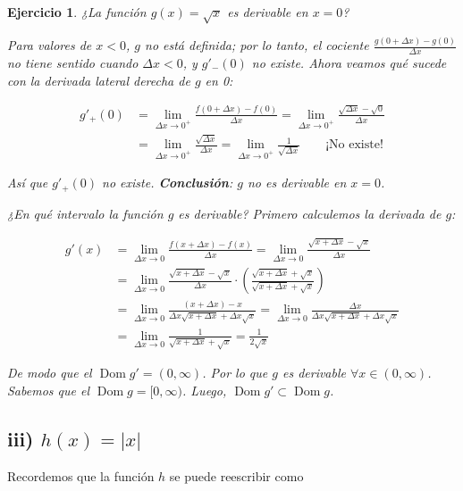 \documentclass[12pt,tikz,border=5pt]{article}
\newtheorem{ejercicio}{Ejercicio}[section]
\begin{document}
\begin{ejercicio}
¿La función $g(x) = \sqrt{x}$ es derivable en $x=0$?

Para valores de $x<0$, $g$ no está definida; por lo tanto, el cociente $\frac{g(0+\Delta x)-g(0)}{\Delta x}$ no tiene sentido cuando $\Delta x<0$, y $g'_-(0)$ no existe.
Ahora veamos qué sucede con la derivada lateral derecha de $g$ en 0:

\begin{align*}
g'_+(0) &= \lim_{\Delta x\to 0^+}\frac{f(0+\Delta x)-f(0)}{\Delta x} = \lim_{\Delta x\to 0^+}\frac{\sqrt{\Delta x}-\sqrt{0}}{\Delta x} \\[4pt]
&= \lim_{\Delta x\to 0^+}\frac{\sqrt{\Delta x}}{\Delta x} = \lim_{\Delta x\to 0^+}\frac{1}{\sqrt{\Delta x}} \qquad \text{¡No existe!}
\end{align*}

Así que $g'_{+}(0)$ no existe. \textbf{Conclusión}: $g$ no es derivable en $x=0$. \bigskip

¿En qué intervalo la función $g$ es derivable? Primero calculemos la derivada de $g$:

\begin{align*}
g'(x) &= \lim_{\Delta x\to 0}\frac{f(x+\Delta x)-f(x)}{\Delta x} = \lim_{\Delta x\to 0}\frac{\sqrt{x+\Delta x}-\sqrt{x}}{\Delta x} \\[4pt]
&= \lim_{\Delta x\to 0}\frac{\sqrt{x+\Delta x}-\sqrt{x}}{\Delta x}\cdot\left(\frac{\sqrt{x+\Delta x}+\sqrt{x}}{\sqrt{x+\Delta x}+\sqrt{x}}\right) \\[4pt]
&= \lim_{\Delta x\to 0}\frac{(x+\Delta x)-x}{\Delta x\sqrt{x+\Delta x}+\Delta x\sqrt{x}} = \lim_{\Delta x\to 0}\frac{\Delta x}{\Delta x\sqrt{x+\Delta x}+\Delta x\sqrt{x}} \\[4pt]
&= \lim_{\Delta x\to 0}\frac{1}{\sqrt{x+\Delta x}+\sqrt{x}} = \frac{1}{2\sqrt{x}}
\end{align*}

 De modo que el $\operatorname{Dom} g' = (0,\infty)$. Por lo que $g$ es derivable $\forall x\in(0,\infty)$. Sabemos que el $\operatorname{Dom} g = [0,\infty)$. Luego, $\operatorname{Dom} g' \subset \operatorname{Dom} g$.

\end{ejercicio}

\subsection*{iii) $h(x) = |x|$}

Recordemos que la función $h$ se puede reescribir como
\end{document}
